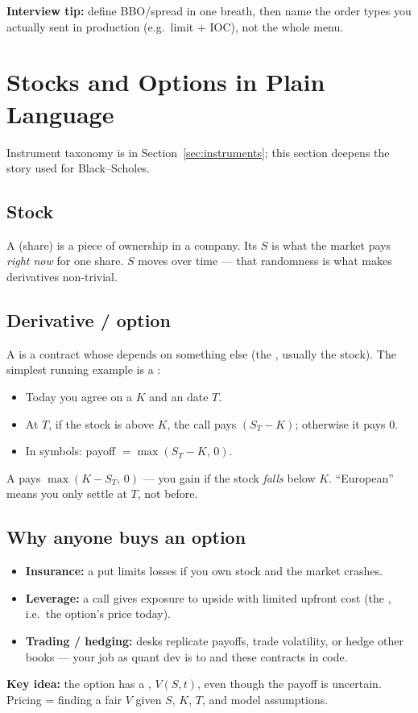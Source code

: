 \par\noindent\textbf{Interview tip:} define BBO/spread in one breath, then name the 
order types you actually sent in production (e.g.\ limit + IOC), not the whole menu.

\section{Stocks and Options in Plain Language}
\label{sec:plain-options}
Instrument taxonomy is in Section~\ref{sec:instruments}; this section deepens the 
 story used for Black--Scholes.

\subsection{Stock}
A  (share) is a piece of ownership in a company. Its  
$S$ is what the market pays \emph{right now} for one share. $S$ moves over time --- that 
randomness is what makes derivatives non-trivial.

\subsection{Derivative / option}
A  is a contract whose  depends on something else 
(the , usually the stock). The simplest running example is a 
:
\begin{itemize}
    \item Today you agree on a  $K$ and an  date $T$.
    \item At $T$, if the stock is above $K$, the call pays $(S_T - K)$; otherwise it pays $0$.
    \item In symbols: payoff $= \max(S_T - K,\, 0)$.
\end{itemize}
A  pays $\max(K - S_T,\, 0)$ --- you gain if the stock \emph{falls} 
below $K$. ``European'' means you only settle at $T$, not before.

\subsection{Why anyone buys an option}
\begin{itemize}
    \item \textbf{Insurance:} a put limits losses if you own stock and the market crashes.
    \item \textbf{Leverage:} a call gives exposure to upside with limited upfront cost 
          (the , i.e.\ the option's price today).
    \item \textbf{Trading / hedging:} desks replicate payoffs, trade volatility, or hedge 
          other books --- your job as quant dev is to  and  
          these contracts in code.
\end{itemize}
\textbf{Key idea:} the option has a , $V(S,t)$, even though the 
payoff is uncertain. Pricing = finding a fair $V$ given $S$, $K$, $T$, and model assumptions.

